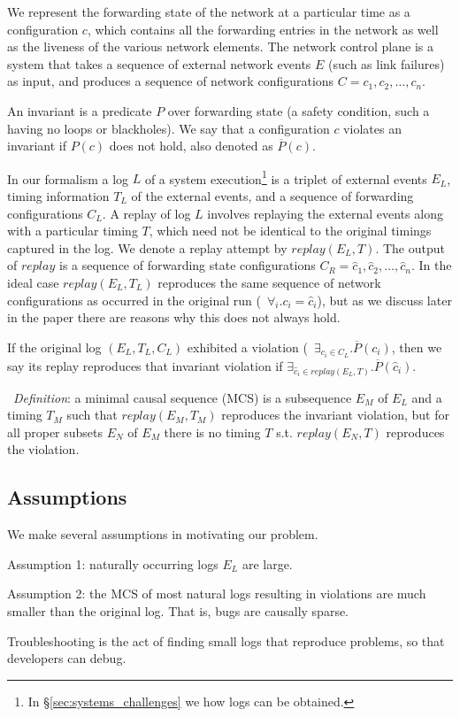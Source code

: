 We represent the forwarding state of the network
at a particular time as a configuration $c$, which contains all the forwarding
entries in the network
as well as the liveness of the various network elements.
The network control plane is a system that takes a sequence of
external network events $E$ (such as link failures) as input,
and produces a sequence of network configurations
$C = c_1,c_2,\dots,c_n$.

An invariant is a predicate $P$ over forwarding state (a safety
condition, such a having no loops or blackholes). We say that a configuration
$c$ violates an invariant if $P(c)$ does not
hold, also denoted as $\overline{P}(c)$.

In our formalism a log $L$ of a system execution\footnote{In
\S\ref{sec:systems_challenges} we how logs can be obtained.} is a triplet of external events $E_L$,
timing information $T_L$ of the external events, and a sequence of forwarding
configurations $C_L$.
A replay of log $L$ involves replaying the external events along with a
particular timing $T$,
which need not be identical to the original timings captured in the log.
We denote a replay attempt by $replay(E_L,T)$.
The output of $replay$ is a sequence of forwarding state configurations
$C_R = \hat{c}_1,\hat{c}_2,\dots,\hat{c}_n$. In the ideal case $replay(E_L,T_L)$ reproduces the same
sequence of network configurations as occurred in the original run
(\ie~$\forall_i. c_i = \hat{c}_i$), but as we discuss later in the paper there are reasons why
this does not always hold.

If the original log $(E_L, T_L, C_L)$ exhibited a violation
(\ie~$\exists_{c_i \in C_L}. \overline{P}(c_i)$,
then we say its replay reproduces that invariant violation if
$\exists_{\hat{c}_i \in replay(E_L,T)}. \overline{P}(\hat{c}_i)$.

\noindent~{\em Definition}: a minimal causal sequence (MCS) is a subsequence $E_M$ of $E_L$ and a timing $T_M$ such
that $replay(E_M,T_M)$ reproduces the invariant violation, but for all proper
subsets $E_N$ of $E_M$
there is no timing $T$ s.t. $replay(E_N,T)$ reproduces the violation.

\subsection{Assumptions}


We make several assumptions in motivating our problem.

Assumption 1: naturally occurring logs $E_L$ are large.

Assumption 2: the MCS of most natural logs resulting in violations are much smaller than the original log.  That is, bugs are causally sparse.

Troubleshooting is the act of finding small logs that reproduce problems, so that developers can debug.
